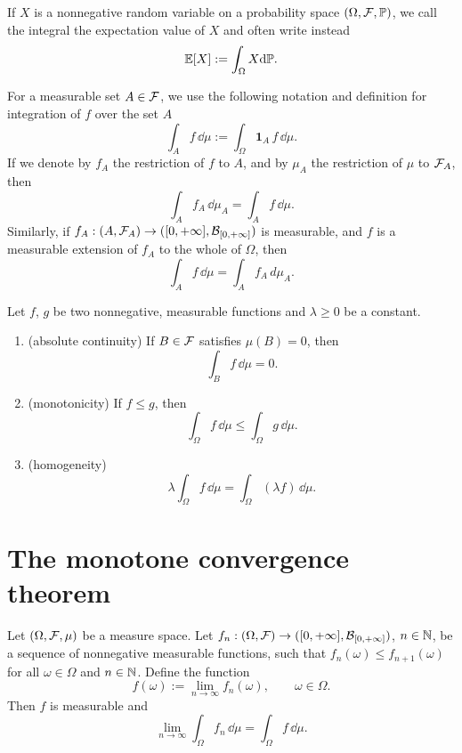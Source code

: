 \begin{remark}
If $X$ is a nonnegative random variable on a probability space $(\Omega, \mathcal F, \mathbb P)$, we call the integral the expectation value of $X$ and often write instead
\[
	\mathbb E\!\left[X\right] := \int_\Omega X \mathrm{d} \mathbb P.
\]
\end{remark}

For a measurable set $A \in \mathcal F$, we use the following notation and definition for integration of $f$ over the set $A$
\[
	\int_A f\, \dd \mu := \int_\Omega \mathbf{1}_A\, f\, \dd \mu.
\]
If we denote by $f_A$ the restriction of $f$ to $A$, and by $\mu_A$ the restriction of $\mu$ to $\mathcal F_A$, then 
\[
\int_A f_A\,\dd \mu_A = \int_A f\, \dd \mu.
\]
Similarly, if $f_A:(A, \mathcal F_A) \to ([0,+\infty],\mathcal B_{[0,+\infty]})$ is measurable, and $f$ is a measurable extension of $f_A$ to the whole of $\Omega$, then
\[
	\int_A f\,\dd \mu = \int_A f_A\, d \mu_A.
\]

\begin{proposition}
	\label{pr:properties-integral-nonneg}
	Let $f$, $g$ be two nonnegative, measurable functions and $\lambda \geq 0$ be a constant.
	\begin{enumerate}
		\item (absolute continuity) If $B \in \mathcal F$ satisfies $\mu(B) = 0$, then
		\[
		\int_{B} f\, \dd \mu = 0. 
		\]
		\item (monotonicity) If $f \leq g$, then
		\[
		\int_\Omega f\, \dd \mu \leq \int_\Omega g\, \dd \mu.
		\]
		\item (homogeneity)
		\[
		\lambda \int_\Omega f\, \dd \mu = \int_\Omega (\lambda f )\,\dd \mu.
		\]
	\end{enumerate}
\end{proposition}


\section{The monotone convergence theorem}
\label{sec:monotone_convergence}

\begin{theorem}
	\label{th:monotone-convergence-I}
	Let $(\Omega, \mathcal F, \mu)$ be a measure space. Let $f_n:(\Omega,\mathcal F) \to ([0,+\infty],\mathcal B_{[0,+\infty]})$, $n \in \mathbb N$, be a sequence of nonnegative measurable functions, such that $f_n(\omega) \leq f_{n+1}(\omega)$ for all $\omega \in \Omega$ and $n \in \mathbb N$. Define the function 
	\[
		f(\omega) := \lim_{n \to \infty} f_n(\omega),\qquad \omega\in\Omega.
	\]
	Then $f$ is measurable and
	\[
	\lim_{n \to \infty} \int_\Omega f_n\, \dd \mu = \int_\Omega f\, \dd \mu.
	\]
\end{theorem}

